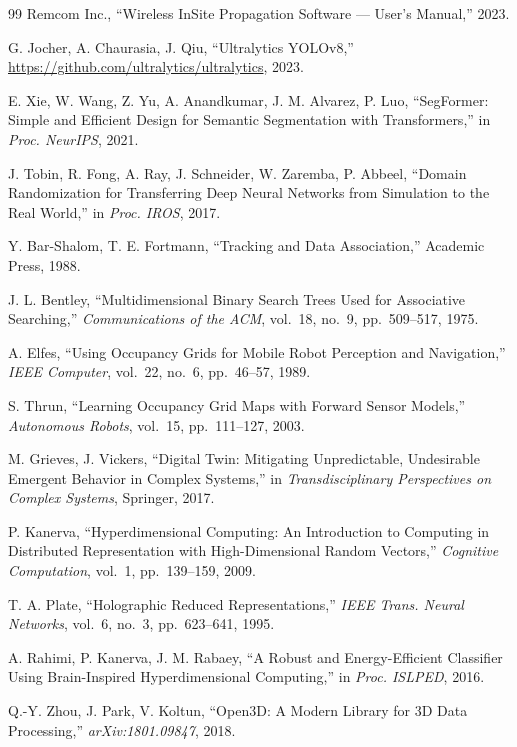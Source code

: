 \documentclass[12pt,a4paper,titlepage]{article}
\begin{document}
\begin{thebibliography}{99}
Remcom Inc.,
``Wireless InSite Propagation Software --- User's Manual,'' 2023.

G. Jocher, A. Chaurasia, J. Qiu,
``Ultralytics YOLOv8,''
\url{https://github.com/ultralytics/ultralytics}, 2023.

E. Xie, W. Wang, Z. Yu, A. Anandkumar, J. M. Alvarez, P. Luo,
``SegFormer: Simple and Efficient Design for Semantic Segmentation with Transformers,''
in \textit{Proc. NeurIPS}, 2021.

J. Tobin, R. Fong, A. Ray, J. Schneider, W. Zaremba, P. Abbeel,
``Domain Randomization for Transferring Deep Neural Networks from Simulation to the Real World,''
in \textit{Proc. IROS}, 2017.

Y. Bar-Shalom, T. E. Fortmann,
``Tracking and Data Association,''
Academic Press, 1988.

J. L. Bentley,
``Multidimensional Binary Search Trees Used for Associative Searching,''
\textit{Communications of the ACM}, vol.~18, no.~9, pp.~509--517, 1975.

A. Elfes,
``Using Occupancy Grids for Mobile Robot Perception and Navigation,''
\textit{IEEE Computer}, vol.~22, no.~6, pp.~46--57, 1989.

S. Thrun,
``Learning Occupancy Grid Maps with Forward Sensor Models,''
\textit{Autonomous Robots}, vol.~15, pp.~111--127, 2003.

M. Grieves, J. Vickers,
``Digital Twin: Mitigating Unpredictable, Undesirable Emergent Behavior in Complex Systems,''
in \textit{Transdisciplinary Perspectives on Complex Systems}, Springer, 2017.

P. Kanerva,
``Hyperdimensional Computing: An Introduction to Computing in Distributed Representation with High-Dimensional Random Vectors,''
\textit{Cognitive Computation}, vol.~1, pp.~139--159, 2009.

T. A. Plate,
``Holographic Reduced Representations,''
\textit{IEEE Trans. Neural Networks}, vol.~6, no.~3, pp.~623--641, 1995.

A. Rahimi, P. Kanerva, J. M. Rabaey,
``A Robust and Energy-Efficient Classifier Using Brain-Inspired Hyperdimensional Computing,''
in \textit{Proc. ISLPED}, 2016.

Q.-Y. Zhou, J. Park, V. Koltun,
``Open3D: A Modern Library for 3D Data Processing,''
\textit{arXiv:1801.09847}, 2018.

\end{thebibliography}
\end{document}
